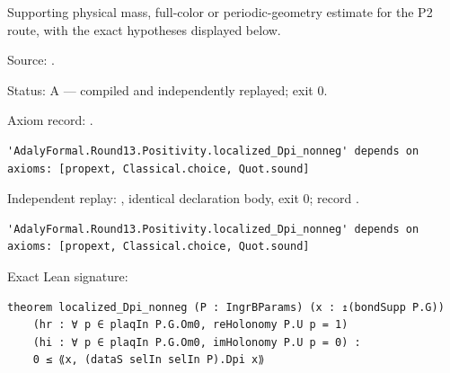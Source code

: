 \begin{theorem}[bp-453]
\label{bp-453}
\leanok
Supporting physical mass, full-color or periodic-geometry estimate for the P2 route, with the exact hypotheses displayed below.

\par Source: \texttt{}.
\par Status: A — compiled and independently replayed; exit 0.
\par Axiom record: \texttt{}.
\begin{verbatim}
'AdalyFormal.Round13.Positivity.localized_Dpi_nonneg' depends on axioms: [propext, Classical.choice, Quot.sound]
\end{verbatim}
\par Independent replay: \texttt{}, identical declaration body, exit 0; record \texttt{}.
\begin{verbatim}
'AdalyFormal.Round13.Positivity.localized_Dpi_nonneg' depends on axioms: [propext, Classical.choice, Quot.sound]
\end{verbatim}
\par Exact Lean signature:
\begin{verbatim}
theorem localized_Dpi_nonneg (P : IngrBParams) (x : ↥(bondSupp P.G))
    (hr : ∀ p ∈ plaqIn P.G.Om0, reHolonomy P.U p = 1)
    (hi : ∀ p ∈ plaqIn P.G.Om0, imHolonomy P.U p = 0) :
    0 ≤ ⟪x, (dataS selIn selIn P).Dpi x⟫
\end{verbatim}
\end{theorem}


